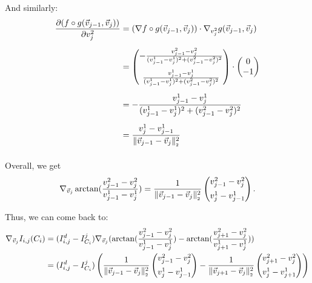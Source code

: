 \begin{proposition}
	And similarly:
	\begin{align*}
		\frac{\partial (f \circ g (\vec{v}_{j-1}, \vec{v}_j))}{\partial v_j^2} &= (\nabla f \circ g (\vec{v}_{j-1}, \vec{v}_j)) \cdot \nabla_{v_j^2} g (\vec{v}_{j-1}, \vec{v}_j) \\[0.5em]
		&= \begin{pmatrix}
			- \frac{v_{j-1}^2 - v_{j}^2}{(v_{j-1}^1 - v_{j}^1)^2 + (v_{j-1}^2 - v_{j}^2)^2} \\[1.0em]
			\frac{v_{j-1}^1 - v_{j}^1}{(v_{j-1}^1 - v_{j}^1)^2 + (v_{j-1}^2 - v_{j}^2)^2}
		\end{pmatrix}
		\cdot 
		\begin{pmatrix}
			0 \\
			-1
		\end{pmatrix} \\[0.5em]
		&= - \frac{v_{j-1}^1 - v_{j}^1}{(v_{j-1}^1 - v_{j}^1)^2 + (v_{j-1}^2 - v_{j}^2)^2} \\[0.5em]
		&= \frac{v_{j}^1 - v_{j-1}^1}{\norm[\vec{v}_{j-1} - \vec{v}_j]^2} \\[0.5em]
	\end{align*}

	Overall, we get 
	\begin{align*}
		\nabla_{\vec{v}_j} \arctan(\frac{v_{j-1}^2 - v_{j}^2}{v_{j-1}^1 - v_{j}^1}) = \frac{1}{\norm[\vec{v}_{j-1} - \vec{v}_j]^2} \begin{pmatrix}
			v_{j-1}^2 - v_{j}^2 \\[0.5em]
			v_{j}^1 - v_{j-1}^1
		\end{pmatrix}.
	\end{align*}
	
	Thus, we can come back to: 
	\begin{align*}
		\nabla_{\vec{v}_j}  I_{i, j}(C_i) 
		&= (I_{i, j}^d - I^j_{C_i}) \nabla_{\vec{v}_j} (\arctan(\frac{v_{j-1}^2 - v_{j}^2}{v_{j-1}^1 - v_{j}^1}) - \arctan(\frac{v_{j+1}^2 - v_{j}^2}{v_{j+1}^1 - v_{j}^1})) \\
		&= (I_{i, j}^d - I^j_{C_i}) \left( 
		  \frac{1}{\norm[\vec{v}_{j-1} - \vec{v}_j]^2} \begin{pmatrix}
			v_{j-1}^2 - v_{j}^2 \\[0.5em]
			v_{j}^1 - v_{j-1}^1
		\end{pmatrix} 
		- \frac{1}{\norm[\vec{v}_{j+1} - \vec{v}_j]^2} \begin{pmatrix}
			v_{j+1}^2 - v_{j}^2 \\[0.5em]
			v_{j}^1 - v_{j+1}^1
		\end{pmatrix} \right) 
	\end{align*}


\end{proposition}
